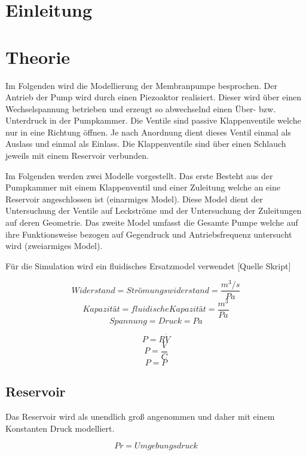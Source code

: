 \documentclass[fontsize=12pt, a4paper]{scrartcl}
\let\stdsection\section 	%
\renewcommand\section{\newpage\stdsection}
\begin{document}
\tableofcontents            %


\section{Einleitung}



\section{Theorie}

Im Folgenden wird die Modellierung der Membranpumpe besprochen. Der Antrieb der Pump wird durch einen Piezoaktor realisiert. Dieser wird über einen Wechselspannung betrieben und erzeugt so abwechselnd einen Über- bzw. Unterdruck in der Pumpkammer. Die Ventile sind passive Klappenventile welche nur in eine Richtung öffnen. Je nach Anordnung dient dieses Ventil einmal als Auslass und einmal als Einlass. Die Klappenventile sind über einen Schlauch jeweils mit einem Reservoir verbunden.

Im Folgenden werden zwei Modelle vorgestellt. Das erste Besteht aus der Pumpkammer mit einem Klappenventil und einer Zuleitung welche an eine Reservoir angeschlossen ist (einarmiges Model). Diese Model dient der Untersuchung der Ventile auf Leckströme und der Untersuchung der Zuleitungen auf deren Geometrie. Das zweite Model umfasst die Gesamte Pumpe welche auf ihre Funktionsweise bezogen auf Gegendruck und Antriebsfrequenz untersucht wird (zweiarmiges Model).

Für die Simulation wird ein fluidisches Ersatzmodel verwendet [Quelle Skript]

\[ Widerstand = Strömungswiderstand = \frac{m^3/s}{Pa} \]
\[ Kapazität = fluidische Kapazität = \frac{m^3}{Pa} \]
\[ Spannung = Druck = Pa \]

\[ P = R\dot{V} \]
\[ P = \frac{V}{C} \]
\[ P = P \]

\subsection{Reservoir}
Das Reservoir wird als unendlich groß angenommen und daher mit einem Konstanten Druck modelliert.


\[ Pr = Umgebungsdruck \]
\end{document}
